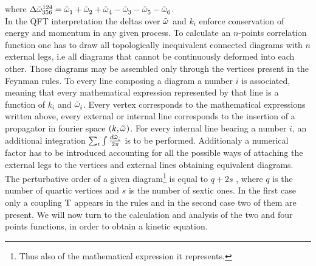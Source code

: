 \begin{center}
\end{center}
where $ \Delta{\tilde{\omega}}^{124}_{356} = \tilde{\omega}^{}_1 + \tilde{\omega}^{}_2 + \tilde{\omega}^{}_4 - \tilde{\omega}^{}_3 - \tilde{\omega}^{}_5 - \tilde{\omega}^{}_6$. \\

In the QFT interpretation the deltas over $\tilde{\omega}^{}$ and $k_i$ enforce conservation of energy and momentum in any given process. To calculate an $n$-points 
correlation function one has to draw all topologically inequivalent connected diagrams with $n$ external legs, i.e all diagrams that cannot be continuously deformed into each other.
Those diagrams may be assembled only through the vertices present in the Feynman rules. To every line composing a diagram a number $i$ is associated,
meaning that every mathematical expression represented by that line is a function of $k_i$ and $\tilde{\omega}^{}_i$. Every vertex corresponds to the mathematical expressions 
written above, every external or internal line corresponds to the insertion of a propagator in fourier space $(k, \tilde{\omega}^{})$. For every internal line bearing a number 
$i$, an additional integration $\sum_i \int \frac{d\tilde{\omega}^{}_i}{2\pi}$ is to be performed. Additionaly a numerical factor has to be introduced accounting for all the possible 
ways of attaching the external legs to the vertices and external lines obtaining equivalent diagrams. \\
The perturbative order of a given diagram\footnote{Thus also of the mathematical expression it represents.} is equal to $q + 2s$ , where $q$ is the number of quartic vertices 
and $s$ is the number of sextic ones. In the first case only a coupling $\mathrm{T}$ appears in the rules and in the second case two of them are present. 
We will now turn to the calculation and analysis of the two and four points functions, in order to obtain a kinetic equation. \\

